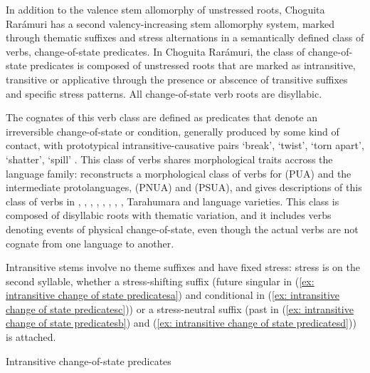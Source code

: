 In addition to the valence stem allomorphy of unstressed roots, Choguita Rarámuri has a second valency-increasing stem allomorphy system, marked through thematic suffixes and stress alternations in a semantically defined class of verbs, change-of-state predicates. In Choguita Rarámuri, the class of change-of-state predicates is composed of unstressed roots that are marked as intransitive, transitive or applicative through the presence or abscence of transitive suffixes and specific stress patterns. All change-of-state verb roots are disyllabic.

The  cognates of this verb class are defined as predicates that denote an irreversible change-of-state or condition, generally produced by some kind of contact, with prototypical intransitive-causative pairs ‘break’, ‘twist’, ‘torn apart’, ‘shatter’, ‘spill’ \citep[][153]{miller1996guarijio}. This class of verbs shares morphological traits accross the  language family: \citet{heath1978uto} reconstructs a morphological class of verbs for  (PUA) and the intermediate protolanguages,  (PNUA) and  (PSUA), and gives descriptions of this class of verbs in , , , , , , , , Tarahumara and  language varieties. This class is composed of disyllabic roots with thematic variation, and it includes verbs denoting events of physical change-of-state, even though the actual verbs are not cognate from one language to another.

Intransitive stems involve no theme suffixes and have fixed stress: stress is on the second syllable, whether a stress-shifting suffix (future singular in (\ref{ex: intransitive change of state predicatesa}) and conditional in (\ref{ex: intransitive change of state predicatesc})) or a stress-neutral suffix (past in (\ref{ex: intransitive change of state predicatesb}) and (\ref{ex: intransitive change of state predicatesd})) is attached.

\ea\label{ex: intransitive change of state predicates}
{Intransitive change-of-state predicates}

